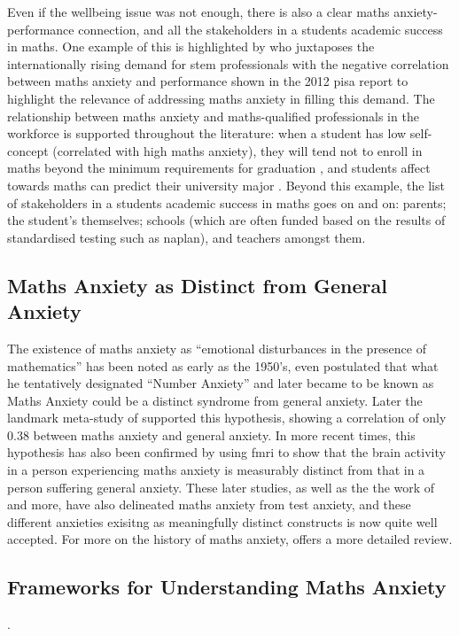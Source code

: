 \documentclass[twoside,12pt,a4paper]{report}
\begin{document}
Even if the wellbeing issue was not enough, there is also a clear maths anxiety-performance connection, and all the stakeholders in a students academic success in maths. One example of this is highlighted by  who juxtaposes the internationally rising demand for \gls{stem} professionals with the negative correlation between maths anxiety and performance shown in the 2012 \gls{pisa} report \cite{PISA2013} to highlight the relevance of addressing maths anxiety in filling this demand. The relationship between maths anxiety and maths-qualified professionals in the workforce is supported throughout the literature: when a student has low self-concept (correlated with high maths anxiety), they will tend not to enroll in maths beyond the minimum requirements for graduation \cite{Ashcraft2007book}, and students affect towards maths can predict their university major \cite{LeFevre1992}. Beyond this example, the list of stakeholders in a students academic success in maths goes on and on: parents; the student's themselves; schools (which are often funded based on the results of standardised testing such as \gls{naplan}), and teachers amongst them. 


\subsection*{Maths Anxiety as Distinct from General Anxiety}

The existence of maths anxiety as ``emotional disturbances in the presence of mathematics'' has been noted as early as the 1950's,  even postulated that what he tentatively designated ``Number Anxiety'' and later became to be known as Maths Anxiety could be a distinct syndrome from general anxiety. Later the landmark meta-study of  supported this hypothesis, showing a correlation of only $0.38$ between maths anxiety and general anxiety. In more recent times, this hypothesis has also been confirmed by  using \gls{fmri} to show that the brain activity in a person experiencing maths anxiety is measurably distinct from that in a person suffering general anxiety. These later studies, as well as the the work of  and more, have also delineated maths anxiety from test anxiety, and these different anxieties exisitng as meaningfully distinct constructs is now quite well accepted. For more on the history of maths anxiety,  offers a more detailed review.


\subsection*{Frameworks for Understanding Maths Anxiety}.
\end{document}
